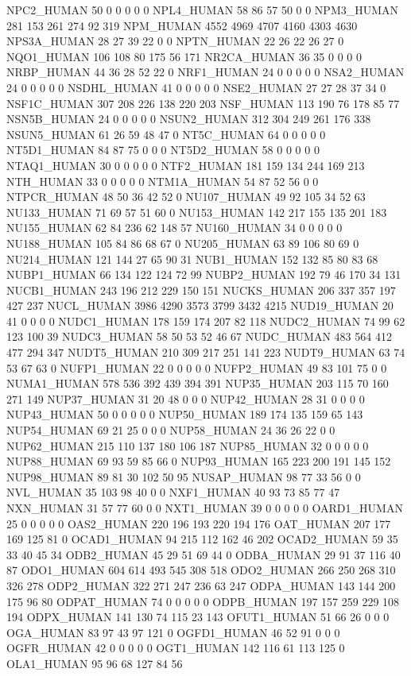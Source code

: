 NPC2_HUMAN	50	0	0	0	0	0
NPL4_HUMAN	58	86	57	50	0	0
NPM3_HUMAN	281	153	261	274	92	319
NPM_HUMAN	4552	4969	4707	4160	4303	4630
NPS3A_HUMAN	28	27	39	22	0	0
NPTN_HUMAN	22	26	22	26	27	0
NQO1_HUMAN	106	108	80	175	56	171
NR2CA_HUMAN	36	35	0	0	0	0
NRBP_HUMAN	44	36	28	52	22	0
NRF1_HUMAN	24	0	0	0	0	0
NSA2_HUMAN	24	0	0	0	0	0
NSDHL_HUMAN	41	0	0	0	0	0
NSE2_HUMAN	27	27	28	37	34	0
NSF1C_HUMAN	307	208	226	138	220	203
NSF_HUMAN	113	190	76	178	85	77
NSN5B_HUMAN	24	0	0	0	0	0
NSUN2_HUMAN	312	304	249	261	176	338
NSUN5_HUMAN	61	26	59	48	47	0
NT5C_HUMAN	64	0	0	0	0	0
NT5D1_HUMAN	84	87	75	0	0	0
NT5D2_HUMAN	58	0	0	0	0	0
NTAQ1_HUMAN	30	0	0	0	0	0
NTF2_HUMAN	181	159	134	244	169	213
NTH_HUMAN	33	0	0	0	0	0
NTM1A_HUMAN	54	87	52	56	0	0
NTPCR_HUMAN	48	50	36	42	52	0
NU107_HUMAN	49	92	105	34	52	63
NU133_HUMAN	71	69	57	51	60	0
NU153_HUMAN	142	217	155	135	201	183
NU155_HUMAN	62	84	236	62	148	57
NU160_HUMAN	34	0	0	0	0	0
NU188_HUMAN	105	84	86	68	67	0
NU205_HUMAN	63	89	106	80	69	0
NU214_HUMAN	121	144	27	65	90	31
NUB1_HUMAN	152	132	85	80	83	68
NUBP1_HUMAN	66	134	122	124	72	99
NUBP2_HUMAN	192	79	46	170	34	131
NUCB1_HUMAN	243	196	212	229	150	151
NUCKS_HUMAN	206	337	357	197	427	237
NUCL_HUMAN	3986	4290	3573	3799	3432	4215
NUD19_HUMAN	20	41	0	0	0	0
NUDC1_HUMAN	178	159	174	207	82	118
NUDC2_HUMAN	74	99	62	123	100	39
NUDC3_HUMAN	58	50	53	52	46	67
NUDC_HUMAN	483	564	412	477	294	347
NUDT5_HUMAN	210	309	217	251	141	223
NUDT9_HUMAN	63	74	53	67	63	0
NUFP1_HUMAN	22	0	0	0	0	0
NUFP2_HUMAN	49	83	101	75	0	0
NUMA1_HUMAN	578	536	392	439	394	391
NUP35_HUMAN	203	115	70	160	271	149
NUP37_HUMAN	31	20	48	0	0	0
NUP42_HUMAN	28	31	0	0	0	0
NUP43_HUMAN	50	0	0	0	0	0
NUP50_HUMAN	189	174	135	159	65	143
NUP54_HUMAN	69	21	25	0	0	0
NUP58_HUMAN	24	36	26	22	0	0
NUP62_HUMAN	215	110	137	180	106	187
NUP85_HUMAN	32	0	0	0	0	0
NUP88_HUMAN	69	93	59	85	66	0
NUP93_HUMAN	165	223	200	191	145	152
NUP98_HUMAN	89	81	30	102	50	95
NUSAP_HUMAN	98	77	33	56	0	0
NVL_HUMAN	35	103	98	40	0	0
NXF1_HUMAN	40	93	73	85	77	47
NXN_HUMAN	31	57	77	60	0	0
NXT1_HUMAN	39	0	0	0	0	0
OARD1_HUMAN	25	0	0	0	0	0
OAS2_HUMAN	220	196	193	220	194	176
OAT_HUMAN	207	177	169	125	81	0
OCAD1_HUMAN	94	215	112	162	46	202
OCAD2_HUMAN	59	35	33	40	45	34
ODB2_HUMAN	45	29	51	69	44	0
ODBA_HUMAN	29	91	37	116	40	87
ODO1_HUMAN	604	614	493	545	308	518
ODO2_HUMAN	266	250	268	310	326	278
ODP2_HUMAN	322	271	247	236	63	247
ODPA_HUMAN	143	144	200	175	96	80
ODPAT_HUMAN	74	0	0	0	0	0
ODPB_HUMAN	197	157	259	229	108	194
ODPX_HUMAN	141	130	74	115	23	143
OFUT1_HUMAN	51	66	26	0	0	0
OGA_HUMAN	83	97	43	97	121	0
OGFD1_HUMAN	46	52	91	0	0	0
OGFR_HUMAN	42	0	0	0	0	0
OGT1_HUMAN	142	116	61	113	125	0
OLA1_HUMAN	95	96	68	127	84	56
